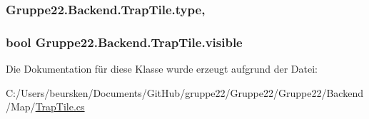 \hypertarget{class_gruppe22_1_1_backend_1_1_trap_tile_aca739cc12c54484bad034479e2ca6e71}{
\subsubsection[{type}]{ Gruppe22.\-Backend.\-Trap\-Tile.\-type\hspace{0.3cm}{\ttfamily [get]}, {\ttfamily [set]}}}\label{class_gruppe22_1_1_backend_1_1_trap_tile_aca739cc12c54484bad034479e2ca6e71}
\hypertarget{class_gruppe22_1_1_backend_1_1_trap_tile_af1ebd53e3386f0edbed814e5beb10509}{
\subsubsection[{visible}]{\setlength{\rightskip}{0pt plus 5cm}bool Gruppe22.\-Backend.\-Trap\-Tile.\-visible\hspace{0.3cm}{\ttfamily [get]}}}\label{class_gruppe22_1_1_backend_1_1_trap_tile_af1ebd53e3386f0edbed814e5beb10509}


Die Dokumentation für diese Klasse wurde erzeugt aufgrund der Datei\-:\begin{DoxyCompactItemize}
\item 
C\-:/\-Users/beursken/\-Documents/\-Git\-Hub/gruppe22/\-Gruppe22/\-Gruppe22/\-Backend/\-Map/\hyperlink{_trap_tile_8cs}{Trap\-Tile.\-cs}\end{DoxyCompactItemize}
